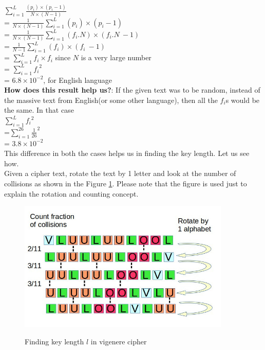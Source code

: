 \documentclass{llncs}
\begin{document}
$\sum_{i=1}^L \frac{(p_i) \times (p_i - 1)}{ N \times (N-1)}$\\

= $ \frac{1}{ N \times (N-1)}\sum_{i=1}^L (p_i) \times (p_i - 1)$\\

= $ \frac{1}{ N \times (N-1)}\sum_{i=1}^L (f_i.N) \times (f_i.N\ - 1)$\\

= $ \frac{1}{N-1}\sum_{i=1}^L (f_i) \times (f_i\ - 1)$\\

= $\sum_{i=1}^L f_i \times f_i$		\hspace{5mm} since $N$ is a very large number\\

= $\sum_{i=1}^L {f_i}^2$\\

= $6.8 \times {10}^{-2}$, for English language\\

\textbf{How does this result help us?}: If the given text was to be random, instead of the massive text from English(or some other language), then all the $f_i$s would be the same. In that case\\	

$\sum_{i=1}^L {f_i}^2$\\

=$\sum_{i=1}^{26} {\frac{1}{26}}^2$\\

= $3.8 \times {10}^{-2}$  \\

This difference in both the cases helps us in finding the key length. Let us see how. \\

Given a cipher text, rotate the text by 1 letter and look at the number of collisions as shown in the Figure \ref{vigc}. Please note that the figure is used just to explain the rotation and counting concept. 

\begin{figure}[h]
\centering
\includegraphics[width=0.9\textwidth]{vig_c.jpg}
\label{vigc}
\caption{Finding key length $l$ in vigenere cipher}
\end{figure}
\end{document}
